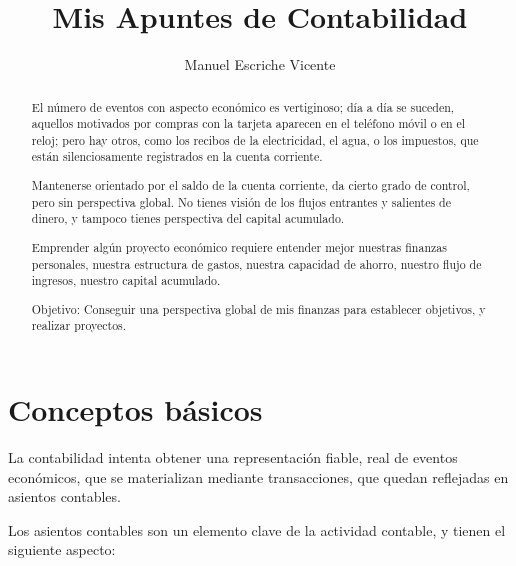 \documentclass[12pt, a4paper]{article}
\title{Mis Apuntes de Contabilidad}
\author{Manuel Escriche Vicente}
\begin{document}
\maketitle
\begin{abstract}
El número de eventos con aspecto económico es vertiginoso; día a día se suceden, aquellos motivados por compras con la tarjeta aparecen en el teléfono móvil o en el reloj; pero hay otros, como los recibos de la electricidad, el agua, o los impuestos, que están silenciosamente registrados en la cuenta corriente. 
 
Mantenerse orientado por el saldo de la cuenta corriente, da cierto grado de control, pero sin perspectiva global. No tienes visión de los flujos entrantes y salientes de dinero, y tampoco tienes perspectiva del capital acumulado.

Emprender algún proyecto económico requiere entender mejor nuestras finanzas personales, nuestra estructura de gastos, nuestra capacidad de ahorro, nuestro flujo de ingresos, nuestro capital acumulado. 

Objetivo: Conseguir una perspectiva global de mis finanzas para establecer objetivos, y realizar proyectos.
\end{abstract}
\tableofcontents
\newpage

\section{Conceptos básicos}
La contabilidad intenta obtener una representación fiable, real de eventos económicos, que se materializan mediante transacciones, que quedan reflejadas en asientos contables.
\par
Los asientos contables son un elemento clave de la actividad contable, y tienen el siguiente aspecto:
\begin{figure}[h]
\centering
\end{figure}
%
\end{document}
